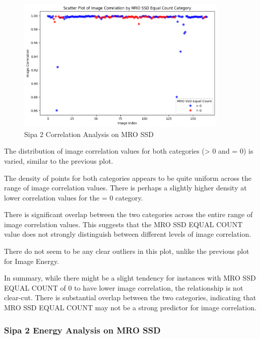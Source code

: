 \begin{figure}[ht]
    \centering
    \includegraphics[width=0.9\textwidth]{Figures/Results/sipa_02/correlation.png}
    \caption[Sipa 2 Correlation Analysis on MRO SSD]{Sipa 2 Correlation Analysis on MRO SSD}
    \label{fig:Sipa 2 Correlation Analysis on MRO SSD}
\end{figure}

The distribution of image correlation values for both categories (> 0 and = 0) is varied, similar to the previous plot.

The density of points for both categories appears to be quite uniform across the range of image correlation values. There is perhaps a slightly higher density at lower correlation values for the = 0 category.

There is significant overlap between the two categories across the entire range of image correlation values. This suggests that the MRO SSD EQUAL COUNT value does not strongly distinguish between different levels of image correlation.

There do not seem to be any clear outliers in this plot, unlike the previous plot for Image Energy.

In summary, while there might be a slight tendency for instances with MRO SSD EQUAL COUNT of 0 to have lower image correlation, the relationship is not clear-cut. There is substantial overlap between the two categories, indicating that MRO SSD EQUAL COUNT may not be a strong predictor for image correlation.

\newpage

\subsubsection{Sipa 2 Energy Analysis on MRO SSD}


